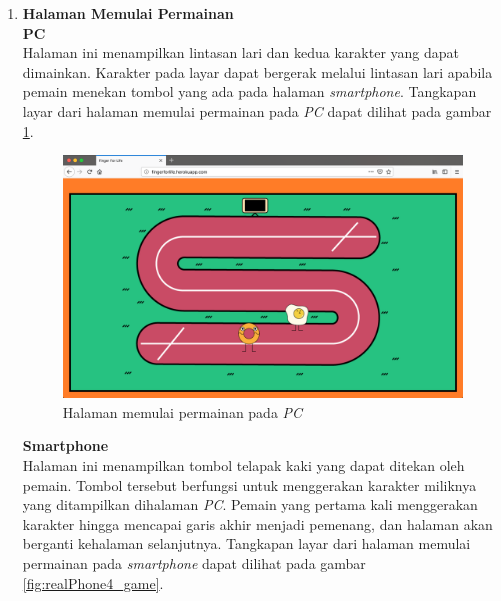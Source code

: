 \begin{enumerate}
	
	\item \textbf{Halaman Memulai Permainan} \\
	\textbf{PC} \\
	Halaman ini menampilkan lintasan lari dan kedua karakter yang dapat dimainkan. Karakter pada layar dapat bergerak melalui lintasan lari apabila pemain menekan tombol yang ada pada halaman \textit{smartphone}. Tangkapan layar dari halaman memulai permainan pada \textit{PC} dapat dilihat pada gambar \ref{fig:realWeb4_game}.
	
	\begin{figure}[H]
		\centering
		\includegraphics[scale=0.25]{Gambar/realWeb4_game}
		\caption{Halaman memulai permainan pada \textit{PC}}
		\label{fig:realWeb4_game}
	\end{figure}
	
	\textbf{Smartphone} \\
	Halaman ini menampilkan tombol telapak kaki yang dapat ditekan oleh pemain. Tombol tersebut berfungsi untuk menggerakan karakter miliknya yang ditampilkan dihalaman \textit{PC}. Pemain yang pertama kali menggerakan karakter hingga mencapai garis akhir menjadi pemenang, dan halaman akan berganti kehalaman selanjutnya. Tangkapan layar dari halaman memulai permainan pada \textit{smartphone} dapat dilihat pada gambar \ref{fig:realPhone4_game}.
	

\end{enumerate}
